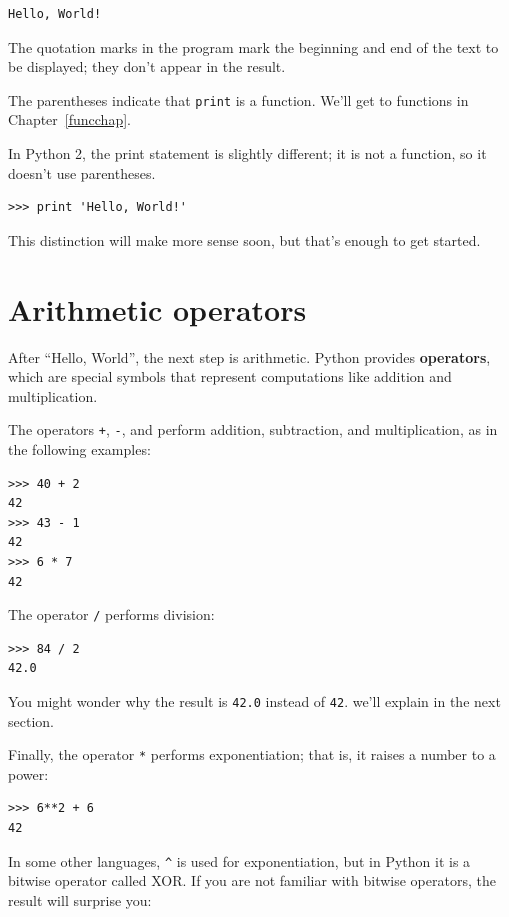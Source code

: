 \begin{verbatim}
Hello, World!
\end{verbatim}
%
The quotation marks in the program mark the beginning and end
of the text to be displayed; they don't appear in the result.

The parentheses indicate that {\tt print} is a function. We'll get
to functions in Chapter~\ref{funcchap}.
 

In Python 2, the print statement is slightly different; it is not
a function, so it doesn't use parentheses.

\begin{verbatim}
>>> print 'Hello, World!'
\end{verbatim}
%
This distinction will make more sense soon, but that's enough to
get started.


\section{Arithmetic operators}

After ``Hello, World'', the next step is arithmetic. Python provides
{\bf operators}, which are special symbols that represent computations
like addition and multiplication. 

The operators {\tt +}, {\tt -}, and {\tt *} perform addition,
subtraction, and multiplication, as in the following examples:

\begin{verbatim}
>>> 40 + 2
42
>>> 43 - 1
42
>>> 6 * 7
42
\end{verbatim}
%
The operator {\tt /} performs division:

\begin{verbatim}
>>> 84 / 2
42.0
\end{verbatim}
%
You might wonder why the result is {\tt 42.0} instead of {\tt 42}.
we'll explain in the next section.

Finally, the operator {\tt **} performs exponentiation; that is,
it raises a number to a power:

\begin{verbatim}
>>> 6**2 + 6
42
\end{verbatim}
%
In some other languages, \verb"^" is used for exponentiation, but
in Python it is a bitwise operator called XOR. If you are not
familiar with bitwise operators, the result will surprise you:

